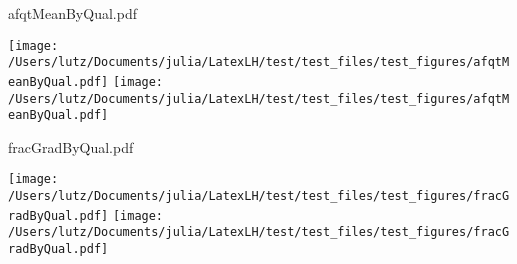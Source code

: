 \documentclass[english]{article}
\begin{document}
afqtMeanByQual.pdf

\texttt{[image: /Users/lutz/Documents/julia/LatexLH/test/test\_files/test\_figures/afqtMeanByQual.pdf]} \texttt{[image: /Users/lutz/Documents/julia/LatexLH/test/test\_files/test\_figures/afqtMeanByQual.pdf]}

fracGradByQual.pdf

\texttt{[image: /Users/lutz/Documents/julia/LatexLH/test/test\_files/test\_figures/fracGradByQual.pdf]} \texttt{[image: /Users/lutz/Documents/julia/LatexLH/test/test\_files/test\_figures/fracGradByQual.pdf]}
\end{document}
